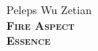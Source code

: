 \onecolumn

\begin{center}
    {\FancyFont\Huge Peleps Wu Zetian}\\[7pt]
    {\scshape\bfseries\Large
        Fire Aspect\\[5pt]
        Essence~\EssenceDots
    }
\end{center}
\vspace{\baselineskip}


\PrintAttributeList
\PrintAbilityList


\PrintWeaponList


\cleardoublepage
{}
\PrintCharmList{}

\twocolumn


